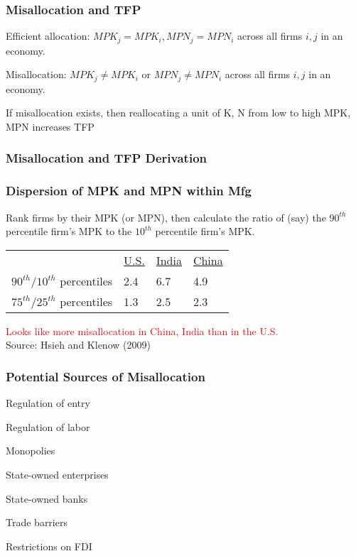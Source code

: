 \documentclass[serif,professionalfont,red,aspectratio=169]{beamer}
\begin{document}
\begin{frame}[t]
\frametitle{Misallocation and TFP
}
\vspace{4mm}
Efficient allocation: $MPK_j=MPK_i, MPN_j=MPN_i$ across all firms $i, j$  in an economy.
\vspace{8mm}

Misallocation: $MPK_j \neq MPK_i$ or $MPN_j \neq MPN_i$ across all firms $i, j$  in an economy.
\vspace{8mm}

If misallocation exists, then reallocating a unit of K, N from low to high MPK, MPN increases TFP
\end{frame}
\begin{frame}[t]
\frametitle{Misallocation and TFP Derivation}
\end{frame}
\begin{frame}[t]
\frametitle{Dispersion of MPK and MPN within Mfg}
\vspace{2mm}
Rank firms by their MPK (or MPN), then calculate the ratio of (say) the $90^{th}$ percentile firm's MPK to the $10^{th}$ percentile firm's MPK.
\begin{table}
\centering
\renewcommand*\arraystretch{1.8}
    \begin{tabular}{l l l l}
   & \underline{U.S.} & \underline{India} & \underline{China}\\
   $90^{th}/10^{th}$ percentiles & 2.4 & 6.7 &4.9\\
   $75^{th}/25^{th}$ percentiles & 1.3 & 2.5&2.3\\
    \end{tabular}
\end{table}
\vspace{4mm}
\textcolor{red}{Looks like more misallocation in China, India than in the U.S.}\\
\vspace{4mm}
\small{Source:  Hsieh and Klenow} (2009)
\end{frame}
\begin{frame}[t]
\frametitle{Potential Sources of Misallocation}
\vspace{4mm}
Regulation of entry
\vspace{4mm}

Regulation of labor
\vspace{4mm}

Monopolies
\vspace{4mm}

State-owned enterprises
\vspace{4mm}

State-owned banks
\vspace{4mm}

Trade barriers
\vspace{4mm}

Restrictions on FDI
\end{frame}
\end{document}
